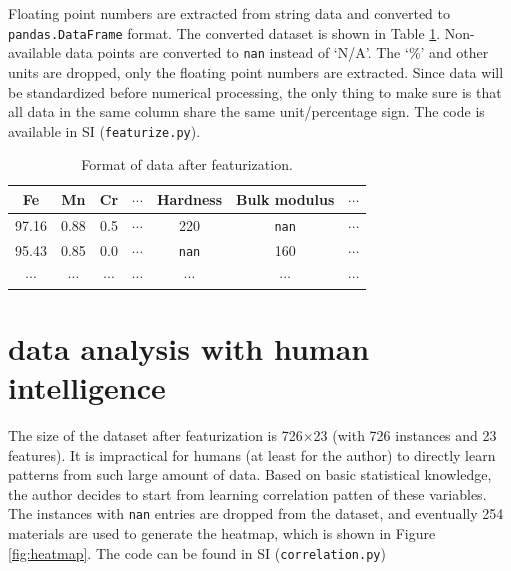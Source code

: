\documentclass[10pt,aps,prb,amsmath,amssymb,twocolumn,letterpaper,nobalancelastpage,final,citeautoscript,floatfix,raggedbottom,superscriptaddress]{revtex4-1}
\begin{document}
Floating point numbers are extracted from string data and converted to \texttt{pandas.DataFrame} format. The converted dataset is shown in Table \ref{tab:featurization}. Non-available data points are converted to \texttt{nan} instead of `N/A'. The `\%' and other units are dropped, only the floating point numbers are extracted. Since data will be standardized before numerical processing, the only thing to make sure is that all data in the same column share the same unit/percentage sign. The code is available in SI (\texttt{featurize.py}).

\vspace{-10pt}
\begin{table}[h]
\begin{ruledtabular}
\caption{Format of data after featurization.\label{tab:featurization}}\centering
\begin{tabular}{ccccccc}
\sffamily Fe & \sffamily Mn & \sffamily Cr &  \sffamily $\cdots$ &  \sffamily Hardness &  \sffamily Bulk modulus &  \sffamily $\cdots$ \\
\hline 
97.16 & 0.88 & 0.5 & $\cdots$ & 220 & \texttt{nan} & $\cdots$\\
\hline
95.43 & 0.85 & 0.0 & $\cdots$ & \texttt{nan} & 160 & $\cdots$\\
\hline
$\cdots$ & $\cdots$ & $\cdots$ & $\cdots$ & $\cdots$ & $\cdots$ & $\cdots$
\end{tabular}
\end{ruledtabular}
\end{table}


\section{data analysis with human intelligence}

The size of the dataset after featurization is 726$\times$23 (with 726 instances and 23 features). It is impractical for humans (at least for the author) to directly learn patterns from such large amount of data. Based on basic statistical knowledge, the author decides to start from learning correlation patten of these variables. The instances with \texttt{nan} entries are dropped from the dataset, and eventually 254 materials are used to generate the heatmap, which is shown in Figure \ref{fig:heatmap}. The code can be found in SI (\texttt{correlation.py})
\end{document}
